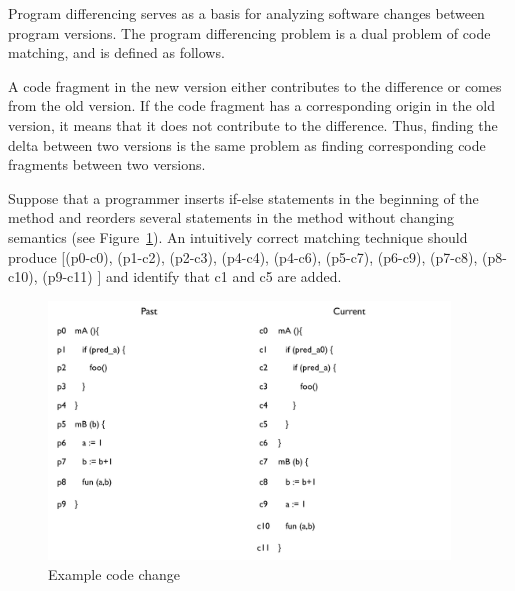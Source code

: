 Program differencing serves as a basis for analyzing software changes between program versions. The program differencing problem is a dual problem of code matching, and is defined as follows. 
 

A code fragment in the new version either contributes to the difference or comes from the old version. If the code fragment has a corresponding origin in the old version, it means that it does not contribute to the difference. Thus, finding the delta between two versions is the same problem as finding corresponding code fragments between two versions. 

Suppose that a programmer inserts if-else statements in the beginning of the method  and reorders several statements in the method  without changing semantics (see Figure~\ref{fig:changeexample}). An intuitively correct matching technique should produce [(p0-c0), (p1-c2), (p2-c3), (p4-c4), (p4-c6), (p5-c7), (p6-c9), (p7-c8), (p8-c10), (p9-c11) ] and identify that c1 and c5 are added.  

\begin{figure}
\centering
\includegraphics[width=0.95\textwidth]{images/DifferencingExample.pdf}
\caption{Example code change}
\label{fig:changeexample} 
\end{figure}

